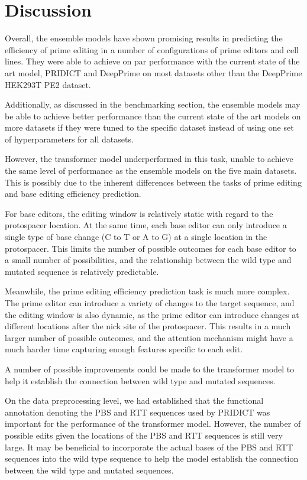 \chapter{Discussion}

Overall, the ensemble models have shown promising results in predicting the efficiency of prime editing in a number of configurations of prime editors and cell lines. They were able to achieve on par performance with the current state of the art model, PRIDICT and DeepPrime on most datasets other than the DeepPrime HEK293T PE2 dataset. 

Additionally, as discussed in the benchmarking section, the ensemble models may be able to achieve better performance than the current state of the art models on more datasets if they were tuned to the specific dataset instead of using one set of hyperparameters for all datasets. 

However, the transformer model underperformed in this task, unable to achieve the same level of performance as the ensemble models on the five main datasets. This is possibly due to the inherent differences between the tasks of prime editing and base editing efficiency prediction. 

For base editors, the editing window is relatively static with regard to the protospacer location. At the same time, each base editor can only introduce a single type of base change (C to T or A to G) at a single location in the protospacer. This limits the number of possible outcomes for each base editor to a small number of possibilities, and the relationship between the wild type and mutated sequence is relatively predictable.

Meanwhile, the prime editing efficiency prediction task is much more complex. The prime editor can introduce a variety of changes to the target sequence, and the editing window is also dynamic, as the prime editor can introduce changes at different locations after the nick site of the protospacer. This results in a much larger number of possible outcomes, and the attention mechanism might have a much harder time capturing enough features specific to each edit.

A number of possible improvements could be made to the transformer model to help it establish the connection between wild type and mutated sequences. 

On the data preprocessing level, we had established that the functional annotation denoting the PBS and RTT sequences used by PRIDICT was important for the performance of the transformer model. However, the number of possible edits given the locations of the PBS and RTT sequences is still very large. It may be beneficial to incorporate the actual bases of the PBS and RTT sequences into the wild type sequence to help the model establish the connection between the wild type and mutated sequences. 

